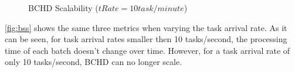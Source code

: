 \begin{figure}[h]
    \centering
    \vspace{-0.15in}
    \caption{BCHD Scalability ($tRate = 10 task/minute$)}
    \label{fig:bs}
\end{figure}

\cref{fig:bss} shows the same three metrics when varying the task arrival rate. As it can be seen, for task arrival rates smaller then 10 tasks/second, the processing time of each batch doesn't change over time. However, for a task arrival rate of only 10 tasks/second, BCHD can no longer scale.

